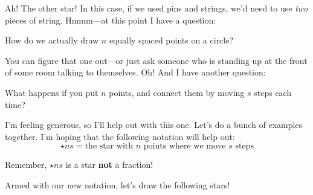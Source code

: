 Ah! The other star! In this case, if we used pins and strings, we'd
need to use \textit{two} pieces of string. Hmmm---at this point I have
a question:
\begin{ques} 
How do we actually draw $n$ equally spaced points on a circle?
\end{ques}
\QM 
You can figure that one out---or just ask someone who is standing up at
the front of some room talking to themselves. Oh! And I have another
question:
\begin{ques} 
What happens if you put $n$ points, and connect them by moving $s$
steps each time?
\end{ques}
I'm feeling generous, so I'll help out with this one. Let's do a bunch
of examples together. I'm hoping that the following notation will help
out:
\[
\star{n}{s}=\text{the star with $n$ points where we move $s$ steps}
\]
\begin{war}
Remember, $\star{n}{s}$ is a star \textbf{not} a fraction!
\end{war}
Armed with our new notation, let's draw the following stars!

